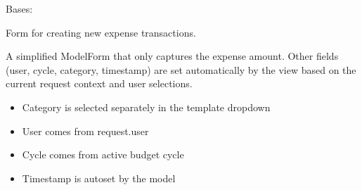 \documentclass[letterpaper,10pt,english]{sphinxmanual}
\begin{document}
\begin{fulllineitems}
\label{\detokenize{expensesApp:expensesApp.froms.ExpenseForm}}
\pysigstartsignatures
\pysiglinewithargsret
{}
{\sphinxparamcomma {}\sphinxparamcomma {}\sphinxparamcomma {}\sphinxparamcomma {}\sphinxparamcomma {}\sphinxparamcomma {}\sphinxparamcomma {}\sphinxparamcomma {}\sphinxparamcomma {}\sphinxparamcomma {}}
{}
\pysigstopsignatures
\sphinxAtStartPar
Bases: 

\sphinxAtStartPar
Form for creating new expense transactions.

\sphinxAtStartPar
A simplified ModelForm that only captures the expense amount.
Other fields (user, cycle, category, timestamp) are set automatically
by the view based on the current request context and user selections.
\begin{description}
\begin{itemize}
\item {} 
\sphinxAtStartPar
Category is selected separately in the template dropdown

\item {} 
\sphinxAtStartPar
User comes from request.user

\item {} 
\sphinxAtStartPar
Cycle comes from active budget cycle

\item {} 
\sphinxAtStartPar
Timestamp is auto\sphinxhyphen{}set by the model


\end{itemize}
\end{description}
\end{fulllineitems}
\end{document}
